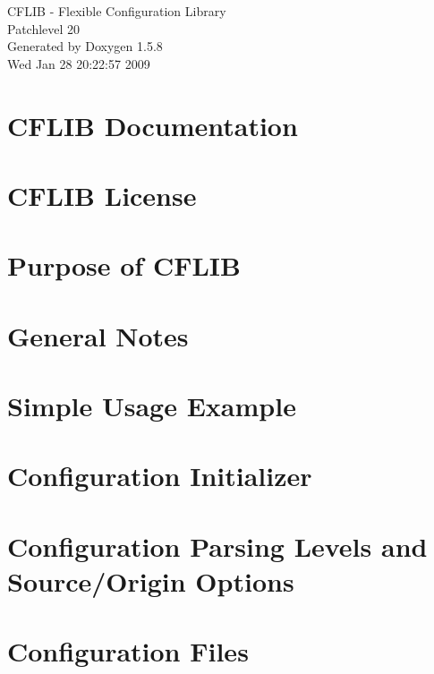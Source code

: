 \documentclass[a4paper]{article}
\begin{document}
\begin{titlepage}
\vspace*{7cm}
\begin{center}
{\Large CFLIB - Flexible Configuration Library \\[1ex]\large Patchlevel 20 }\\
\vspace*{1cm}
{\large Generated by Doxygen 1.5.8}\\
\vspace*{0.5cm}
{\small Wed Jan 28 20:22:57 2009}\\
\end{center}
\end{titlepage}
\tableofcontents
{}
\section{CFLIB Documentation}
\label{index}\hypertarget{index}{}
\section{CFLIB License}
\label{license}
\hypertarget{license}{}

\section{Purpose of CFLIB}
\label{purpose}
\hypertarget{purpose}{}

\section{General Notes}
\label{properties}
\hypertarget{properties}{}

\section{Simple Usage Example}
\label{simple_example}
\hypertarget{simple_example}{}

\section{Configuration Initializer}
\label{config_initializer}
\hypertarget{config_initializer}{}

\section{Configuration Parsing Levels and Source/Origin Options}
\label{config_levels}
\hypertarget{config_levels}{}

\section{Configuration Files}
\label{config_files}
\hypertarget{config_files}{}

\end{document}
